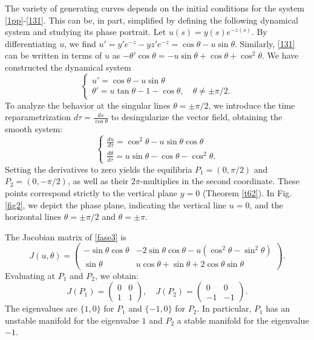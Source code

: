 \documentclass[a4paper,12pt]{amsart}
\theoremstyle{plain}
\theoremstyle{definition}
\begin{document}
The variety of generating curves depends on the initial conditions for the system \eqref{1pp}-\eqref{131}. This can be, in part, simplified by defining the following dynamical system and studying its phase portrait. Let $u(s) = y(s)e^{-z(s)}$. 
By differentiating $u$, we find $u' = y' e^{-z} - y z' e^{-z} = \cos\theta - u\sin\theta$. Similarly, \eqref{131} can be written in terms of $u$ as $-\theta'\cos\theta = -u \sin\theta + \cos\theta + \cos^2\theta$. We have constructed the dynamical system
\begin{equation}\label{fase2}
\begin{cases}
u' = \cos\theta - u\sin\theta \\
\theta' = u\tan\theta - 1 - \cos\theta, \quad \theta \neq \pm \pi/2.
\end{cases}
\end{equation} 
To analyze the behavior at the singular lines $\theta = \pm \pi/2$, we introduce the time reparametrization $d\tau = \frac{ds}{\cos\theta}$ to desingularize the vector field, obtaining the smooth system:
\begin{equation}\label{fase3}
\begin{cases}
\frac{du}{d\tau} = \cos^2\theta - u\sin\theta\cos\theta \\
\frac{d\theta}{d\tau} = u\sin\theta - \cos\theta - \cos^2\theta.
\end{cases}
\end{equation}
 Setting the derivatives to zero yields the equilibria $P_1=(0, \pi/2)$ and $P_2=(0, -\pi/2)$, as well as their $2\pi$-multiplies in the second coordinate. These points correspond strictly to the vertical plane $y=0$ (Theorem \ref{t62}). In Fig. \ref{fig2}, we depict the phase plane, indicating the vertical line $u=0$, and the horizontal lines $\theta=\pm\pi/2$ and $\theta=\pm\pi$. 


The Jacobian matrix of \eqref{fase3} is
$$J(u, \theta) = \begin{pmatrix} -\sin\theta\cos\theta & -2\sin\theta\cos\theta - u(\cos^2\theta-\sin^2\theta) \\ \sin\theta & u\cos\theta + \sin\theta + 2\cos\theta\sin\theta \end{pmatrix}.$$
Evaluating at $P_1$ and $P_2$, we obtain:
$$J(P_1) = \begin{pmatrix} 0 & 0 \\ 1 & 1 \end{pmatrix},\quad J(P_2) = \begin{pmatrix} 0 & 0 \\ -1 & -1 \end{pmatrix}.$$
The eigenvalues are $\{1, 0\}$ for $P_1$ and $\{-1, 0\}$ for $P_2$. In particular, $P_1$ has an unstable manifold for the eigenvalue $1$ and $P_2$ a stable manifold for the eigenvalue $-1$. 
\end{document}
